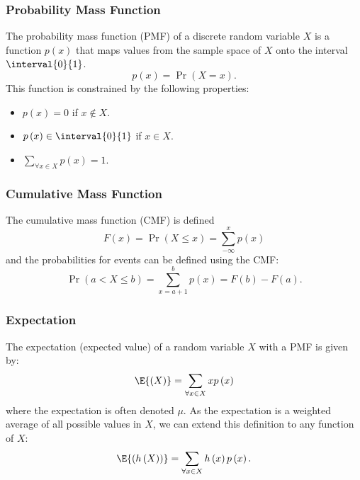 \documentclass{article}
\begin{document}
\subsubsection{Probability Mass Function}
The probability mass function (PMF) of a discrete random variable \(X\)
is a function \(p\left( x \right)\) that maps values from the sample
space of \(X\) onto the interval \(\interval{0}{1}\).
\begin{equation*}
    p\left( x \right) = \Pr{\left( X = x \right)}.
\end{equation*}
This function is constrained by the following properties:
\begin{itemize}
    \item \(p\left( x \right) = 0\) if \(x \notin X\).
    \item \(p\left( x \right) \in \interval{0}{1}\) if \(x \in X\).
    \item \(\sum_{\forall x \in X} p\left( x \right) = 1\).
\end{itemize}
\subsubsection{Cumulative Mass Function}
The cumulative mass function (CMF) is defined
\begin{equation*}
    F\left( x \right) = \Pr{\left( X \leq x \right)} = \sum_{-\infty}^x p\left( x \right)
\end{equation*}
and the probabilities for events can be defined using the CMF\@:
\begin{equation*}
    \Pr{\left( a < X \leq b \right)} = \sum_{x = a + 1}^b p\left( x \right) = F\left( b \right) - F\left( a \right).
\end{equation*}
\subsubsection{Expectation}
The expectation (expected value) of a random variable \(X\) with a PMF
is given by:
\begin{equation*}
    \E{\left( X \right)} = \sum_{\forall x \in X} x p\left( x \right)
\end{equation*}
where the expectation is often denoted \(\mu\). As the expectation is a
weighted average of all possible values in \(X\), we can extend this
definition to any function of \(X\):
\begin{equation*}
    \E{\left( h\left( X \right) \right)} = \sum_{\forall x \in X} h\left( x \right) p\left( x \right).
\end{equation*}
\end{document}
